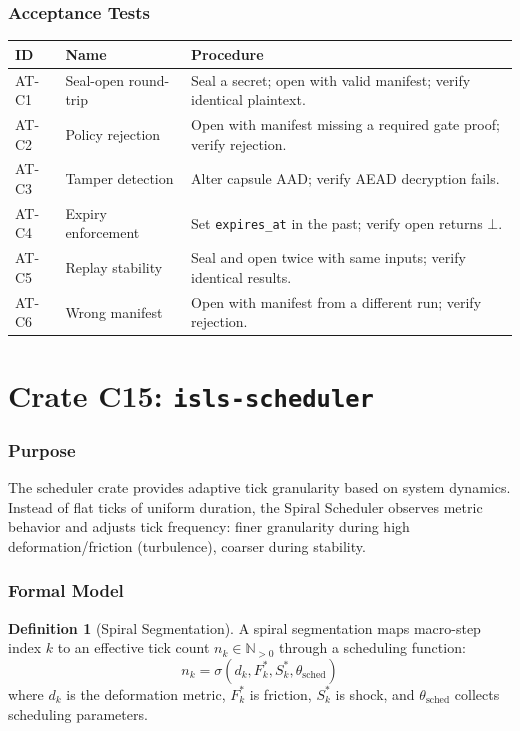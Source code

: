 \documentclass[11pt,a4paper,twoside]{article}
\theoremstyle{definition}
\newtheorem{definition}{Definition}[section]
\theoremstyle{plain}
\theoremstyle{remark}
\newcommand{\NN}{\mathbb{N}}
\begin{document}
\section{Acceptance Tests}\label{sec:cap:tests}

\begin{tabularx}{\textwidth}{l l X}
\toprule
\textbf{ID} & \textbf{Name} & \textbf{Procedure} \\
\midrule
AT-C1 & Seal-open round-trip & Seal a secret; open with valid manifest;
  verify identical plaintext. \\
AT-C2 & Policy rejection & Open with manifest missing a required gate
  proof; verify rejection. \\
AT-C3 & Tamper detection & Alter capsule AAD; verify AEAD decryption
  fails. \\
AT-C4 & Expiry enforcement & Set \texttt{expires\_at} in the past; verify
  open returns $\bot$. \\
AT-C5 & Replay stability & Seal and open twice with same inputs; verify
  identical results. \\
AT-C6 & Wrong manifest & Open with manifest from a different run; verify
  rejection. \\
\bottomrule
\end{tabularx}


\part{Crate C15: \texttt{isls-scheduler}}\label{part:scheduler}

\section{Purpose}\label{sec:sched:purpose}

The scheduler crate provides adaptive tick granularity based on system
dynamics. Instead of flat ticks of uniform duration, the Spiral Scheduler
observes metric behavior and adjusts tick frequency: finer granularity
during high deformation/friction (turbulence), coarser during stability.

\section{Formal Model}\label{sec:sched:model}

\begin{definition}[Spiral Segmentation]\label{def:spiralseg}
A spiral segmentation maps macro-step index $k$ to an effective tick
count $n_k \in \NN_{>0}$ through a scheduling function:
\[
  n_k = \sigma(d_k, F^*_k, S^*_k, \theta_{\mathrm{sched}})
\]
where $d_k$ is the deformation metric, $F^*_k$ is friction, $S^*_k$ is
shock, and $\theta_{\mathrm{sched}}$ collects scheduling parameters.
\end{definition}
\end{document}
